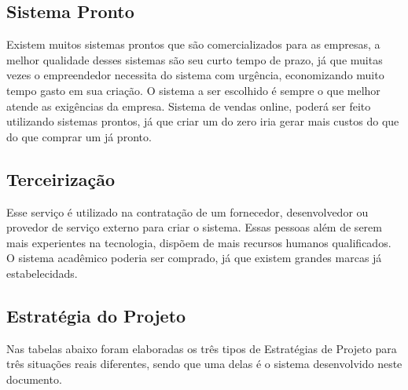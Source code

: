 \subsection{Sistema Pronto}
Existem muitos sistemas prontos que são comercializados para as empresas, a melhor qualidade desses sistemas são seu curto tempo de prazo, já que muitas vezes o empreendedor necessita do sistema com urgência, economizando muito tempo gasto em sua criação. O sistema a ser escolhido é sempre o que melhor atende as exigências da empresa.
Sistema de vendas online, poderá ser feito utilizando sistemas prontos, já que criar um do zero iria gerar mais custos do que do que comprar um já pronto.
\subsection{Terceirização}
 Esse serviço é utilizado na contratação de um fornecedor, desenvolvedor ou provedor de serviço externo para criar o sistema. Essas pessoas além de serem mais experientes na tecnologia, dispõem de mais recursos humanos qualificados.
 O sistema acadêmico poderia ser comprado, já que existem grandes marcas já estabelecidads.
\subsection{Estratégia do Projeto}
 Nas tabelas abaixo foram elaboradas os três tipos de Estratégias de Projeto para três situações reais diferentes, sendo que uma delas é o sistema desenvolvido neste documento.
 
